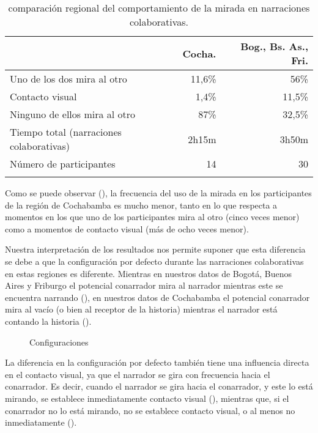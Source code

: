 \documentclass[output=paper]{../langscibook}
\begin{document}
\begin{table}
\caption{\label{tab:satti:1} comparación regional del comportamiento de la mirada en narraciones colaborativas.}
\begin{tabularx}{\textwidth}{Qrr}
\lsptoprule
& Cocha. & Bog., Bs. As., Fri.\\
\midrule
Uno de los dos mira al otro & 11,6\% & 56\%\\
Contacto visual & 1,4\% & 11,5\%\\
Ninguno de ellos mira al otro & 87\% & 32,5\%\\
Tiempo total (narraciones colaborativas) & 2h15m & 3h50m\\
Número de participantes & 14 & 30\\
\lspbottomrule
\end{tabularx}
\end{table}

Como se puede observar (), la frecuencia del uso de la mirada en los participantes de la región de Cochabamba es mucho menor, tanto en lo que respecta a momentos en los que uno de los participantes mira al otro (cinco veces menor) como a momentos de contacto visual (más de ocho veces menor).

Nuestra interpretación de los resultados nos permite suponer que esta diferencia se debe a que la configuración por defecto durante las narraciones colaborativas en estas regiones es diferente. Mientras en nuestros datos de Bogotá, Buenos Aires y Friburgo el potencial conarrador mira al narrador mientras este se encuentra narrando (), en nuestros datos de Cochabamba el potencial conarrador mira al vacío (o bien al receptor de la historia) mientras el narrador está contando la historia ().

\begin{figure}
%
\caption{\label{fig:satti:78}Configuraciones}
\end{figure}

La diferencia en la configuración por defecto también tiene una influencia directa en el contacto visual, ya que el narrador se gira con frecuencia hacia el conarrador. Es decir, cuando el narrador se gira hacia el conarrador, y este lo está mirando, se establece inmediatamente contacto visual (), mientras que, si el conarrador no lo está mirando, no se establece contacto visual, o al menos no inmediatamente ().
\end{document}
